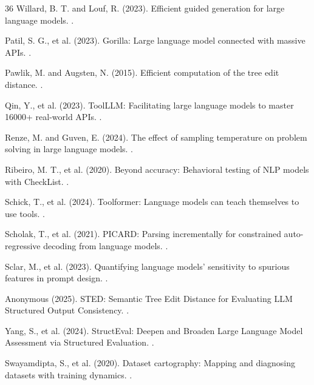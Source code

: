 \documentclass[sigconf,anonymous,review]{acmart}
\begin{document}
\begin{thebibliography}{36}
Willard, B. T. and Louf, R. (2023).
\newblock Efficient guided generation for large language models.
.

Patil, S. G., et al. (2023).
\newblock Gorilla: Large language model connected with massive APIs.
.

Pawlik, M. and Augsten, N. (2015).
\newblock Efficient computation of the tree edit distance.
.

Qin, Y., et al. (2023).
\newblock ToolLLM: Facilitating large language models to master 16000+ real-world APIs.
.

Renze, M. and Guven, E. (2024).
\newblock The effect of sampling temperature on problem solving in large language models.
.

Ribeiro, M. T., et al. (2020).
\newblock Beyond accuracy: Behavioral testing of NLP models with CheckList.
.

Schick, T., et al. (2024).
\newblock Toolformer: Language models can teach themselves to use tools.
.

Scholak, T., et al. (2021).
\newblock PICARD: Parsing incrementally for constrained auto-regressive decoding from language models.
.

Sclar, M., et al. (2023).
\newblock Quantifying language models' sensitivity to spurious features in prompt design.
.

Anonymous (2025).
\newblock STED: Semantic Tree Edit Distance for Evaluating LLM Structured Output Consistency.
.

Yang, S., et al. (2024).
\newblock StructEval: Deepen and Broaden Large Language Model Assessment via Structured Evaluation.
.

Swayamdipta, S., et al. (2020).
\newblock Dataset cartography: Mapping and diagnosing datasets with training dynamics.
.


\end{thebibliography}
\end{document}
